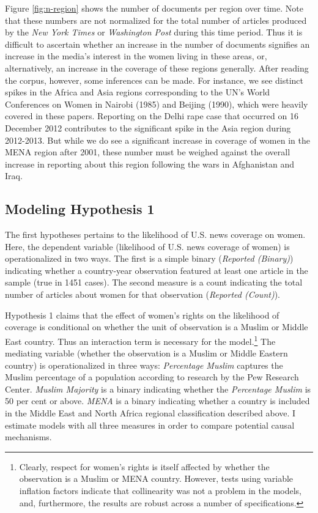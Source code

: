 \documentclass[11pt, oneside]{article}
\begin{document}
Figure \ref{fig:n-region} shows the number of documents per region over time. Note that these numbers are not normalized for the total number of articles produced by the \emph{New York Times} or \emph{Washington Post} during this time period. Thus it is difficult to ascertain whether an increase in the number of documents signifies an increase in the media's interest in the women living in these areas, or, alternatively, an increase in the coverage of these regions generally. After reading the corpus, however, some inferences can be made. For instance, we see distinct spikes in the Africa and Asia regions corresponding to the UN's World Conferences on Women in Nairobi (1985) and Beijing (1990), which were heavily covered in these papers. Reporting on the Delhi rape case that occurred on 16 December 2012 contributes to the significant spike in the Asia region during 2012-2013. But while we do see a significant increase in coverage of women in the MENA region after 2001, these number must be weighed against the overall increase in reporting about this region following the wars in Afghanistan and Iraq.

\subsection{Modeling Hypothesis 1}

The first hypotheses pertains to the likelihood of U.S. news coverage on women. Here, the dependent variable (likelihood of U.S. news coverage of women) is operationalized in two ways. The first is a simple binary (\emph{Reported (Binary)}) indicating whether a country-year observation featured at least one article in the sample (true in 1451 cases). The second measure is a count indicating the total number of articles about women for that observation (\emph{Reported (Count)}). 

Hypothesis 1 claims that the effect of women's rights on the likelihood of coverage is conditional on whether the unit of observation is a Muslim or Middle East country. Thus an interaction term is necessary for the model.\footnote{Clearly, respect for women's rights is itself affected by whether the observation is a Muslim or MENA country. However, tests using variable inflation factors indicate that collinearity was not a problem in the models, and, furthermore, the results are robust across a number of specifications.} The mediating variable (whether the observation is a Muslim or Middle Eastern country) is operationalized in three ways: \emph{Percentage Muslim} captures the Muslim percentage of a population according to research by the Pew Research Center. \emph{Muslim Majority} is a binary indicating whether the \emph{Percentage Muslim} is 50 per cent or above. \emph{MENA} is a binary indicating whether a country is included in the Middle East and North Africa regional classification described above. I estimate models with all three measures in order to compare potential causal mechanisms. 
\end{document}
